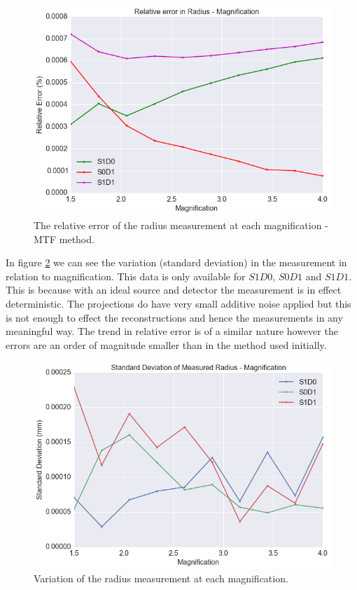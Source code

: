 \documentclass[
  twoside,
  11pt, a4paper,
  footinclude=true,
  headinclude=true,
  cleardoublepage=empty
]{scrbook}
\begin{document}
\begin{figure}[h!]
  \centering
    \includegraphics[width=\textwidth]{code/MTF_and_PSF/MTF_Interp_Polar_Plots_files/MTF_Interp_Polar_Plots_10_0.png}
    \caption{The relative error of the radius measurement at each magnification - MTF method.}
        \label{mtfradius}
\end{figure}

In figure \ref{stdmeasuredradius} we can see the variation (standard deviation) in the measurement in relation to magnification. This data is only available for $S1D0$, $S0D1$ and $S1D1$. This is because with an ideal source and detector the measurement is in effect deterministic. The projections do have very small additive noise applied but this is not enough to effect the reconstructions and hence the measurements in any meaningful way. The trend in relative error is of a similar nature however the errors are an order of magnitude smaller than in the method used initially.

\begin{figure}[h!]
  \centering
    \includegraphics[width=\textwidth]{code/RadiusMeasurements/Plots_RadiusCentre_files/Plots_RadiusCentre_5_0.png}
    \caption{Variation of the radius measurement at each magnification.}
        \label{stdmeasuredradius}
\end{figure}
\end{document}
